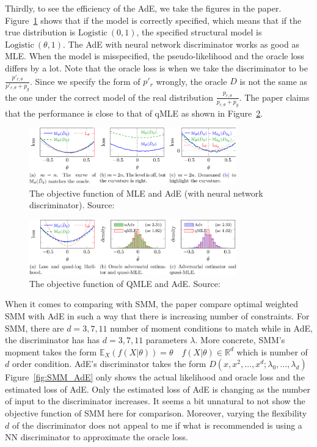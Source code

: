 \documentclass[12pt]{article}
\begin{document}
Thirdly, to see the efficiency of the AdE, we take the figures in the paper.
Figure~\ref{fig:MLE_AdE_NN} shows that if the model is correctly specified,
which means that if the true distribution is $\text{Logistic}~(0,1)$, the
specified structural model is $\text{Logistic}~(\theta,1)$. The AdE with neural
network discriminator works as good as MLE. When the model is misspecified, the
pseudo-likelihood and the oracle loss differs by a lot. Note that the oracle
loss is when we take the discriminator to be
$\frac{p'_{r,\theta}}{p'_{r,\theta}+p_g}$. Since we specify the form of $p'_r$
wrongly, the oracle $D$ is not the same as the one under the correct model of
the real distribution $\frac{p_{r,\theta}}{p_{r,\theta}+p_g}$. The paper claims
that the performance is close to that of qMLE as shown in
Figure~\ref{fig:QMLE_AdE}.
\begin{figure}
    \centering
    \includegraphics[width=0.8\textwidth]{../Figures/MLE_AdE_NN.png}
    \caption{The objective function of MLE and AdE (with neural network discriminator). Source: \citet{kaji2023adversarial}}
    \label{fig:MLE_AdE_NN}
\end{figure}

\begin{figure}
    \centering
    \includegraphics[width=0.8\textwidth]{../Figures/QMLE_AdE.png}
    \caption{The objective function of QMLE and AdE. Source: \citet{kaji2023adversarial}}
    \label{fig:QMLE_AdE}
\end{figure}

When it comes to comparing with SMM, the paper compare optimal weighted SMM
with AdE in such a way that there is increasing number of constraints. For SMM,
there are $d=3,7,11$ number of moment conditions to match while in AdE, the
discriminator has has $d=3,7,11$ parameters $\lambda$. More concrete, SMM's
mopment takes the form $\mathbb{E}_{X}(f(X|\theta)) = \theta \quad
    f(X|\theta)\in \mathbb{R}^d$ which is number of $d$ order condition. AdE's
discriminator takes the form $D(x,x^2,\ldots,x^d;\lambda_0,\ldots,\lambda_d)$
Figure~\ref{fig:SMM_AdE} only shows the actual likelihood and oracle loss and
the estimated loss of AdE. Only the estimated loss of AdE is changing as the
number of input to the discriminator increases. It seems a bit unnatural to not
show the objective function of SMM here for comparison. Moreover, varying the
flexibility $d$ of the discriminator does not appeal to me if what is
recommended is using a NN discriminator to approximate the oracle loss.
\end{document}
